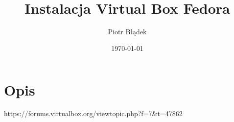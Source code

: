 \documentclass[a4paper,11pt,notitlepage]{article}
\author{Piotr Błądek}
\title{Instalacja Virtual Box Fedora}
\date{\today}
\begin{document}
\maketitle

\section{Opis}

https://forums.virtualbox.org/viewtopic.php?f=7&t=47862
\end{document}
